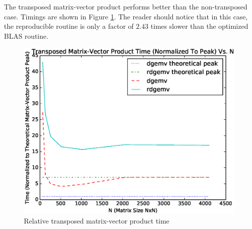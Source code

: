   The transposed matrix-vector product performs better than the non-transposed case. Timings are shown in Figure \ref{fig:gemv_trans_timings}. The reader should notice that in this case, the reproducible routine is only a factor of $2.43$ times slower than the optimized BLAS routine.
  \begin{figure}[H]
  \begin{center}
  \includegraphics[width=\textwidth]{plots/gemv_trans_comparison}
  \caption{Relative transposed matrix-vector product time}
  \label{fig:gemv_trans_timings}
  \end{center}
  \end{figure}


